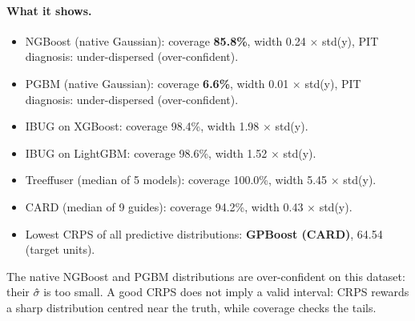 \documentclass[11pt]{article}
\begin{document}
\paragraph{What it shows.}
\begin{itemize}
\item NGBoost (native Gaussian): coverage \textbf{85.8\%}, width 0.24 $\times$ std(y), PIT diagnosis: under-dispersed (over-confident).
\item PGBM (native Gaussian): coverage \textbf{6.6\%}, width 0.01 $\times$ std(y), PIT diagnosis: under-dispersed (over-confident).
\item IBUG on XGBoost: coverage 98.4\%, width 1.98 $\times$ std(y).
\item IBUG on LightGBM: coverage 98.6\%, width 1.52 $\times$ std(y).
\item Treeffuser (median of 5 models): coverage 100.0\%, width 5.45 $\times$ std(y).
\item CARD (median of 9 guides): coverage 94.2\%, width 0.43 $\times$ std(y).
\item Lowest CRPS of all predictive distributions: \textbf{GPBoost (CARD)}, 64.54 (target units).
\end{itemize}
\begin{insight}[Takeaway RQ3]
The native NGBoost and PGBM distributions are over-confident on this dataset: their $\sigma$̂ is too small. A good CRPS does not imply a valid interval: CRPS rewards a sharp distribution centred near the truth, while coverage checks the tails.
\end{insight}
\end{document}
